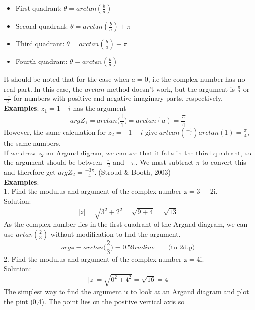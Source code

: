 \documentclass[a4paper, 12pt]{report}
\begin{document}
{\begin{itemize}
\item First quadrant: $\theta = arctan(\frac{b}{a})$
\item Second quadrant: $\theta = arctan(\frac{b}{a}) + \pi$
\item Third quadrant: $\theta = arctan(\frac{b}{a}) - \pi$
\item Fourth quadrant: $\theta = arctan(\frac{b}{a})$
\end{itemize}
It should be noted that for the case when $a = 0$, i.e the complex number has no real part. In this case, the $arctan$ method doesn't work, but the argument is $\frac{\pi}{2}$ or $\frac{-\pi}{2}$ for numbers with positive and negative imaginary parts, respectively.\\
\textbf{Examples}: $z_1 = 1 + i$ has the argument
\begin{equation*}
argZ_1 = arctan\bigg(\frac{1}{1}\bigg) = arctan(a) = \frac{\pi}{4}
\end{equation*}
However, the same calculation for $z_2 = -1 - i$ give $artcan(\frac{-1}{-1}) arctan(1) = \frac{\pi}{4}$, the same numbers.\\
If we draw $z_2$ an Argand digram, we can see that it falls in the third quadrant, so the argument should be between -$\frac{\pi}{2}$ and $-\pi$. We must subtract $\pi$ to convert this and therefore get $argZ_2 = \frac{-3\pi}{4}$. (Stroud \& Booth, 2003)\\
\textbf{Examples}:\\
1. Find the modulus and argument of the complex number z = 3 + 2i.\\
Solution:
\begin{equation*}
|z| = \sqrt{3^2 + 2^2} = \sqrt{9 + 4} = \sqrt{13}
\end{equation*}
As the complex number lies in the first quadrant of the Argand diagram, we can use $artan(\frac{2}{3})$ without modification to find the argument.
\begin{equation*}
argz = arctan\bigg(\frac{2}{3}\bigg) = 0.59radius \qquad \text{(to 2d.p)}
\end{equation*}
2. Find the modulus and argument of the complex number z = 4i.\\
Solution:
\begin{equation}
|z| = \sqrt{0^2 + 4^2} = \sqrt{16} = 4
\end{equation}
The simplest way to find the argument is to look at an Argand diagram and plot the pint (0,4). The point lies on the positive vertical axis so
\begin{equation*}

\end{equation*}}
\end{document}

